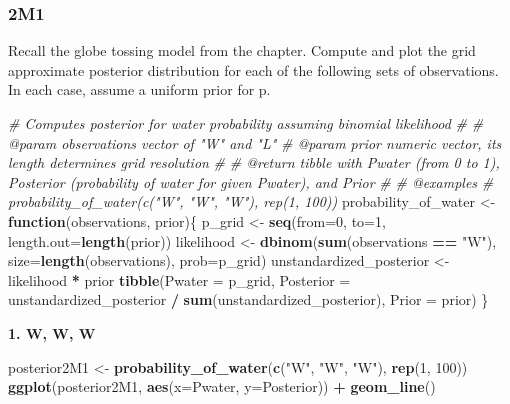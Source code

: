 \documentclass[
]{book}
\newenvironment{Shaded}{\begin{snugshade}}{\end{snugshade}}
\newcommand{\CommentTok}[1]{\textcolor[rgb]{0.56,0.35,0.01}{\textit{#1}}}
\newcommand{\ControlFlowTok}[1]{\textcolor[rgb]{0.13,0.29,0.53}{\textbf{#1}}}
\newcommand{\DataTypeTok}[1]{\textcolor[rgb]{0.13,0.29,0.53}{#1}}
\newcommand{\DecValTok}[1]{\textcolor[rgb]{0.00,0.00,0.81}{#1}}
\newcommand{\KeywordTok}[1]{\textcolor[rgb]{0.13,0.29,0.53}{\textbf{#1}}}
\newcommand{\NormalTok}[1]{#1}
\newcommand{\OperatorTok}[1]{\textcolor[rgb]{0.81,0.36,0.00}{\textbf{#1}}}
\newcommand{\StringTok}[1]{\textcolor[rgb]{0.31,0.60,0.02}{#1}}
\begin{document}
\hypertarget{m1}{%
\subsubsection*{2M1}\label{m1}}

Recall the globe tossing model from the chapter. Compute and plot the grid approximate posterior distribution for each of the following sets of observations. In each case, assume a uniform prior for p.

\begin{Shaded}
\begin{Highlighting}[]
\CommentTok{\#\textquotesingle{} Computes posterior for water probability assuming binomial likelihood}
\CommentTok{\#\textquotesingle{}}
\CommentTok{\#\textquotesingle{} @param observations vector of "W" and "L"}
\CommentTok{\#\textquotesingle{} @param prior numeric vector, its length determines grid resolution}
\CommentTok{\#\textquotesingle{}}
\CommentTok{\#\textquotesingle{} @return tibble with Pwater (from 0 to 1), Posterior (probability of water for given Pwater), and Prior}
\CommentTok{\#\textquotesingle{}}
\CommentTok{\#\textquotesingle{} @examples}
\CommentTok{\#\textquotesingle{} probability\_of\_water(c("W", "W", "W"), rep(1, 100))}
\NormalTok{probability\_of\_water \textless{}{-}}\StringTok{ }\ControlFlowTok{function}\NormalTok{(observations, prior)\{}
\NormalTok{  p\_grid \textless{}{-}}\StringTok{ }\KeywordTok{seq}\NormalTok{(}\DataTypeTok{from=}\DecValTok{0}\NormalTok{, }\DataTypeTok{to=}\DecValTok{1}\NormalTok{, }\DataTypeTok{length.out=}\KeywordTok{length}\NormalTok{(prior))}
\NormalTok{  likelihood \textless{}{-}}\StringTok{ }\KeywordTok{dbinom}\NormalTok{(}\KeywordTok{sum}\NormalTok{(observations }\OperatorTok{==}\StringTok{ "W"}\NormalTok{), }\DataTypeTok{size=}\KeywordTok{length}\NormalTok{(observations), }\DataTypeTok{prob=}\NormalTok{p\_grid)}
\NormalTok{  unstandardized\_posterior \textless{}{-}}\StringTok{ }\NormalTok{likelihood }\OperatorTok{*}\StringTok{ }\NormalTok{prior}
  \KeywordTok{tibble}\NormalTok{(}\DataTypeTok{Pwater =}\NormalTok{ p\_grid,}
         \DataTypeTok{Posterior =}\NormalTok{ unstandardized\_posterior }\OperatorTok{/}\StringTok{ }\KeywordTok{sum}\NormalTok{(unstandardized\_posterior),}
         \DataTypeTok{Prior =}\NormalTok{ prior)}
\NormalTok{\}}
\end{Highlighting}
\end{Shaded}

\textbf{1. W, W, W}

\begin{Shaded}
\begin{Highlighting}[]
\NormalTok{posterior2M1 \textless{}{-}}\StringTok{ }\KeywordTok{probability\_of\_water}\NormalTok{(}\KeywordTok{c}\NormalTok{(}\StringTok{"W"}\NormalTok{, }\StringTok{"W"}\NormalTok{, }\StringTok{"W"}\NormalTok{), }\KeywordTok{rep}\NormalTok{(}\DecValTok{1}\NormalTok{, }\DecValTok{100}\NormalTok{))}
\KeywordTok{ggplot}\NormalTok{(posterior2M1, }\KeywordTok{aes}\NormalTok{(}\DataTypeTok{x=}\NormalTok{Pwater, }\DataTypeTok{y=}\NormalTok{Posterior)) }\OperatorTok{+}\StringTok{ }
\StringTok{  }\KeywordTok{geom\_line}\NormalTok{()}
\end{Highlighting}
\end{Shaded}
\end{document}
